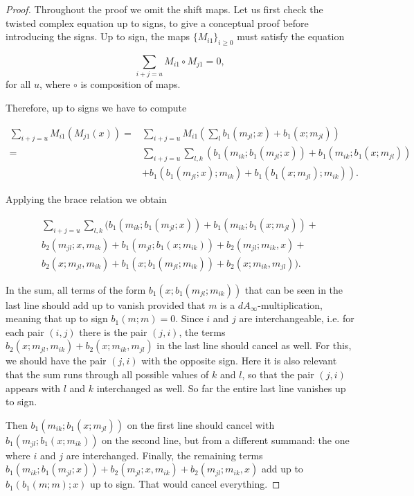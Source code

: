 \documentclass[Thesis.tex]{subfiles}
\begin{document}
\begin{proof}


Throughout the proof we omit the shift maps. Let us first check the twisted complex equation up to signs, to give a conceptual proof before introducing the signs. Up to sign, the maps  $\{M_{i1}\}_{i\geq 0}$ must satisfy the equation

\[\sum_{i+j=u} M_{i1}\circ M_{j1}=0,\]
for all $u$, where $\circ$ is composition of maps. %

Therefore, up to signs we have to compute 

\begin{align*}
\sum_{i+j=u}M_{i1}(M_{j1}(x))=&\sum_{i+j=u}M_{i1}\left(\sum_l b_1(m_{jl};x)+b_1(x;m_{jl})\right)\\
=&\sum_{i+j=u}\sum_{l,k}\left(b_1(m_{ik}; b_1(m_{jl};x))+b_1(m_{ik};b_1(x;m_{jl}))\right.\\
&\left.+b_1(b_1(m_{jl};x);m_{ik})+b_1(b_1(x;m_{jl});m_{ik})\right).
\end{align*}

Applying the brace relation we obtain

\begin{align*}
\sum_{i+j=u}\sum_{l,k}(b_1(m_{ik}; b_1(m_{jl};x))+b_1(m_{ik};b_1(x;m_{jl}))+\\
 b_2(m_{jl};x,m_{ik})+b_1(m_{jl};b_1(x;m_{ik}))+b_2(m_{jl};m_{ik},x)+\\
b_2(x;m_{jl},m_{ik})+b_1(x;b_1(m_{jl};m_{ik}))+b_2(x;m_{ik},m_{jl})).
\end{align*}

In the sum, all terms of the form $b_1(x;b_1(m_{jl};m_{ik}))$ that can be seen in the last line should add up to vanish provided that $m$ is a $dA_\infty$-multiplication, meaning that up to sign $b_1(m;m)=0$. %
 Since $i$ and $j$ are interchangeable, i.e. for each pair $(i,j)$ there is the pair $(j,i)$, the terms $b_2(x;m_{jl},m_{ik})+b_2(x;m_{ik},m_{jl})$ in the last line should cancel as well. For this, we should have the pair $(j,i)$ with the opposite sign. Here it is also relevant that the sum runs through all possible values of $k$ and $l$, so that the pair $(j,i)$ appears with $l$ and $k$ interchanged as well. So far the entire last line vanishes up to sign.

Then $b_1(m_{ik};b_1(x;m_{jl}))$ on the first line should cancel with $b_1(m_{jl};b_1(x;m_{ik}))$ on the second line, but from a different summand: the one where $i$ and $j$ are interchanged. Finally, the remaining terms $b_1(m_{ik}; b_1(m_{jl};x))+b_2(m_{jl};x,m_{ik})+b_2(m_{jl};m_{ik},x)$ add up to $b_1(b_1(m;m);x)$ up to sign. That would cancel everything.


\end{proof}
\end{document}
